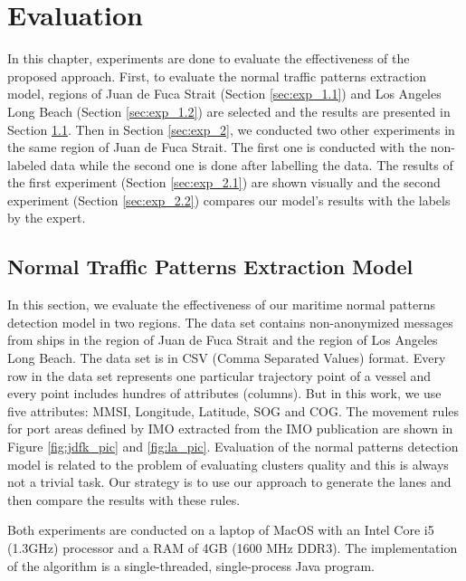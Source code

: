 \documentclass[12pt,glossary]{dalcsthesis}
\begin{document}
\chapter{Evaluation}
\label{ch:evaluation}
In this chapter, experiments are done to evaluate the effectiveness of the proposed approach. First, to evaluate the normal traffic patterns extraction model, regions of Juan de Fuca Strait (Section \ref{sec:exp_1.1}) and Los Angeles Long Beach (Section \ref{sec:exp_1.2}) are selected and the results are presented in Section \ref{sec:exp_1}. Then in Section \ref{sec:exp_2}, we conducted two other experiments in the same region of Juan de Fuca Strait. The first one is conducted with the non-labeled data while the second one is done after labelling the data. The results of the first experiment (Section \ref{sec:exp_2.1}) are  shown  visually  and  the  second  experiment (Section \ref{sec:exp_2.2}) compares our model’s results with the labels by the expert.

\section{Normal Traffic Patterns Extraction Model}
\label{sec:exp_1}
In this section, we evaluate the effectiveness of our maritime normal patterns detection model in two regions. The data set contains non-anonymized messages from ships in the region of Juan de Fuca Strait and the region of Los Angeles Long Beach. The data set is in CSV (Comma Separated Values) format. Every row in the data set represents one particular trajectory point of a vessel and every point includes hundres of attributes (columns). But in this work, we use five attributes: MMSI, Longitude, Latitude, SOG and COG. The movement rules for port areas defined by IMO extracted from the IMO publication \cite{anabook} are shown in Figure \ref{fig:jdfk_pic} and \ref{fig:la_pic}. Evaluation of the normal patterns detection model is related to the problem of evaluating clusters quality and this is always not a trivial task. Our strategy is to use our approach to generate the lanes and then compare the results with these rules.

Both experiments are conducted on a laptop of MacOS with an Intel Core i5 (1.3GHz) processor and a RAM of 4GB (1600 MHz DDR3). The implementation of the algorithm is a single-threaded, single-process Java program. 

\end{document}
